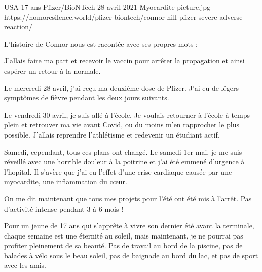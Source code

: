 {USA}
{17 ans}
{Pfizer/BioNTech}
{28 avril 2021}
{Myocardite}
{picture.jpg}
{https://nomoresilence.world/pfizer-biontech/connor-hill-pfizer-severe-adverse-reaction/}
{

L'histoire de Connor nous est racontée avec ses propres mots :

J'allais faire ma part et recevoir le vaccin pour arrêter la propagation et
ainsi espérer un retour à la normale.

Le mercredi 28 avril, j'ai reçu ma deuxième dose de Pfizer. J'ai eu de légers
symptômes de fièvre pendant les deux jours suivants.

Le vendredi 30 avril, je suis allé à l'école. Je voulais retourner à l'école à
temps plein et retrouver ma vie avant Covid, ou du moins m'en rapprocher le plus
possible. J'allais reprendre l'athlétisme et redevenir un étudiant actif.

Samedi, cependant, tous ces plans ont changé. Le samedi 1er mai, je me suis
réveillé avec une horrible douleur à la poitrine et j'ai été emmené d'urgence à
l'hopital. Il s'avère que j'ai eu l'effet d'une crise cardiaque causée par une
myocardite, une inflammation du cœur.

On me dit maintenant que tous mes projets pour l'été ont été mis à l'arrêt. Pas
d'activité intense pendant 3 à 6 mois !

Pour un jeune de 17 ans qui s'apprête à vivre son dernier été avant la
terminale, chaque semaine est une éternité au soleil, mais maintenant, je ne
pourrai pas profiter pleinement de sa beauté. Pas de travail au bord de la
piscine, pas de balades à vélo sous le beau soleil, pas de baignade au bord du
lac, et pas de sport avec les amis.

}

